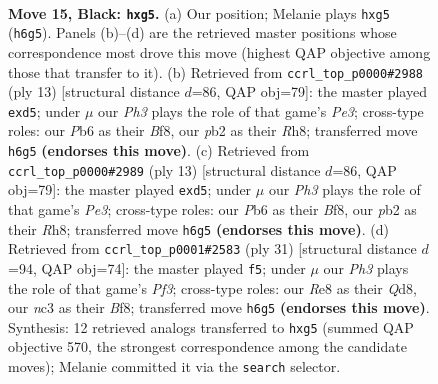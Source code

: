 \documentclass[11pt]{article}
\begin{document}
\clearpage

\begin{figure}[p]\centering
\begin{subfigure}{0.46\textwidth}\centering
\resizebox{\linewidth}{!}{%
\newchessgame
\chessboard[
  setfen={rn1qr1k1/p2n1pb1/1p1p3p/2pP2PP/P3P1P1/2N5/1P2N3/R1BQK2R b KQ - 0 15},
  showmover=false,
  pgfstyle=straightmove, color=movearrow, markmove={h6-g5}
]}
\caption{}
\end{subfigure}\hfill
\begin{subfigure}{0.46\textwidth}\centering
\resizebox{\linewidth}{!}{%
\newchessgame
\chessboard[
  setfen={rn1qkb1r/pbp2p1p/1p2pnp1/3P4/3P4/2NBPN2/PP3PPP/R1BQK2R b KQkq - 0 7},
  showmover=false,
  pgfstyle=straightmove, color=movearrow, markmove={e6-d5}
]}
\caption{}
\end{subfigure}
\\[4pt]
\begin{subfigure}{0.46\textwidth}\centering
\resizebox{\linewidth}{!}{%
\newchessgame
\chessboard[
  setfen={rn1qkb1r/pbp2p1p/1p2pnp1/3P4/3P4/2NBPN2/PP3PPP/R1BQK2R b KQkq - 0 7},
  showmover=false,
  pgfstyle=straightmove, color=movearrow, markmove={e6-d5}
]}
\caption{}
\end{subfigure}\hfill
\begin{subfigure}{0.46\textwidth}\centering
\resizebox{\linewidth}{!}{%
\newchessgame
\chessboard[
  setfen={r2qkbr1/pp4p1/1nn1ppNp/4P2P/3PpP2/8/PP2N1P1/R1BQ1RK1 b q - 5 16},
  showmover=false,
  pgfstyle=straightmove, color=movearrow, markmove={f6-f5}
]}
\caption{}
\end{subfigure}
\caption{\textbf{Move 15, Black: \texttt{hxg5}.} (a) Our position; Melanie plays \texttt{hxg5} (\texttt{h6g5}). Panels (b)--(d) are the retrieved master positions whose correspondence most drove this move (highest QAP objective among those that transfer to it). (b) Retrieved from \texttt{ccrl\_top\_p0000\#2988} (ply 13) [structural distance $d$=86, QAP obj=79]: the master played \texttt{exd5}; under $\mu$ our \emph{Ph3} plays the role of that game's \emph{Pe3}; cross-type roles: our \emph{P}b6 as their \emph{B}f8, our \emph{p}b2 as their \emph{R}h8; transferred move \texttt{h6g5} \textbf{(endorses this move)}. (c) Retrieved from \texttt{ccrl\_top\_p0000\#2989} (ply 13) [structural distance $d$=86, QAP obj=79]: the master played \texttt{exd5}; under $\mu$ our \emph{Ph3} plays the role of that game's \emph{Pe3}; cross-type roles: our \emph{P}b6 as their \emph{B}f8, our \emph{p}b2 as their \emph{R}h8; transferred move \texttt{h6g5} \textbf{(endorses this move)}. (d) Retrieved from \texttt{ccrl\_top\_p0001\#2583} (ply 31) [structural distance $d$=94, QAP obj=74]: the master played \texttt{f5}; under $\mu$ our \emph{Ph3} plays the role of that game's \emph{Pf3}; cross-type roles: our \emph{R}e8 as their \emph{Q}d8, our \emph{n}c3 as their \emph{B}f8; transferred move \texttt{h6g5} \textbf{(endorses this move)}. Synthesis: 12 retrieved analogs transferred to \texttt{hxg5} (summed QAP objective 570, the strongest correspondence among the candidate moves); Melanie committed it via the \texttt{search} selector.}
\label{fig:thought-m29}
\end{figure}
\end{document}
